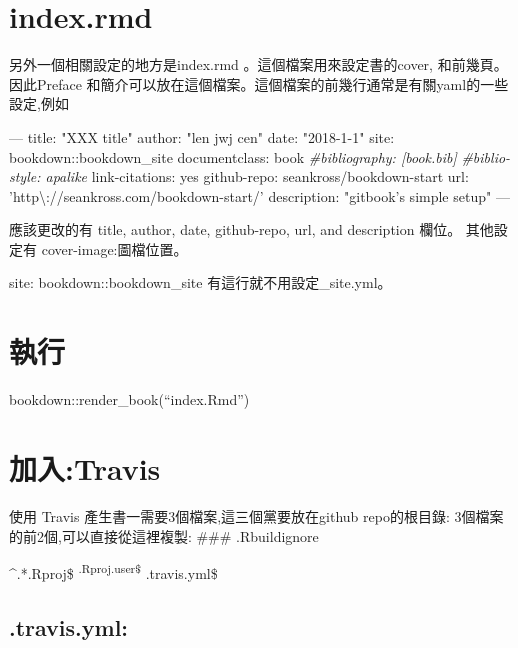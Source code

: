 \documentclass[]{book}
\newenvironment{Shaded}{\begin{snugshade}}{\end{snugshade}}
\newcommand{\AttributeTok}[1]{\textcolor[rgb]{0.77,0.63,0.00}{#1}}
\newcommand{\CommentTok}[1]{\textcolor[rgb]{0.56,0.35,0.01}{\textit{#1}}}
\newcommand{\FunctionTok}[1]{\textcolor[rgb]{0.00,0.00,0.00}{#1}}
\newcommand{\OtherTok}[1]{\textcolor[rgb]{0.56,0.35,0.01}{#1}}
\newcommand{\StringTok}[1]{\textcolor[rgb]{0.31,0.60,0.02}{#1}}
\theoremstyle{definition}
\theoremstyle{definition}
\theoremstyle{definition}
\theoremstyle{remark}
\begin{document}
\hypertarget{index.rmd-1}{%
\section{index.rmd}\label{index.rmd-1}}

另外一個相關設定的地方是index.rmd 。這個檔案用來設定書的cover,
和前幾頁。因此Preface
和簡介可以放在這個檔案。這個檔案的前幾行通常是有關yaml的一些設定,例如

\begin{Shaded}
\begin{Highlighting}[]
\OtherTok{---}
\FunctionTok{title:}\AttributeTok{ }\StringTok{"XXX title"}
\FunctionTok{author:}\AttributeTok{ }\StringTok{"len jwj cen"}
\FunctionTok{date:}\AttributeTok{ }\StringTok{"2018-1-1"}
\FunctionTok{site:}\AttributeTok{ bookdown::bookdown_site}
\FunctionTok{documentclass:}\AttributeTok{ book}
\CommentTok{#bibliography: [book.bib]}
\CommentTok{#biblio-style: apalike}
\FunctionTok{link-citations:}\AttributeTok{ yes}
\FunctionTok{github-repo:}\AttributeTok{ seankross/bookdown-start}
\FunctionTok{url:}\AttributeTok{ }\StringTok{'http\textbackslash{}://seankross.com/bookdown-start/'}
\FunctionTok{description:}\AttributeTok{ }\StringTok{"gitbook's simple setup"}
\OtherTok{---}
\end{Highlighting}
\end{Shaded}

應該更改的有 title, author, date, github-repo, url, and description
欄位。 其他設定有 cover-image:圖檔位置。

site: bookdown::bookdown\_site 有這行就不用設定\_site.yml。

\section{執行}

bookdown::render\_book(``index.Rmd'')

\hypertarget{travis}{%
\section{加入:Travis}\label{travis}}

使用 Travis 產生書一需要3個檔案,這三個黨要放在github repo的根目錄:
3個檔案的前2個,可以直接從這裡複製: \#\#\# .Rbuildignore

\^{}.*.Rproj\$ \textsuperscript{.Rproj.user\$ }.travis.yml\$

\hypertarget{travis.yml-1}{%
\subsection{.travis.yml:}\label{travis.yml-1}}
\end{document}
